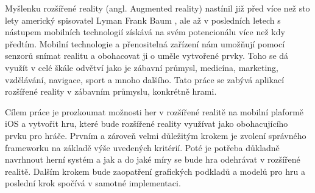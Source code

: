 \documentclass[twoside,12pt]{article}
\begin{document}
\def\,{\penalty10000\hskip.25em}
\pagestyle{headings}

\bakalarska





 
\newpage\null\thispagestyle{empty}\newpage




\obsah


%
%

% 
Myšlenku rozšířené reality (angl. Augmented reality) nastínil již před více než sto lety americký spisovatel Lyman Frank Baum \cite{baum}, ale až v posledních letech s nástupem mobilních technologií získává na svém potencionálu více než kdy předtím. Mobilní technologie a přenositelná zařízení nám umožňují pomocí senzorů snímat realitu a obohacovat ji o uměle vytvořené prvky. Toho se dá využít v celé škále odvětví jako je zábavní průmysl, medicína, marketing, vzdělávání, navigace, sport a mnoho dalšího. Tato práce se zabývá aplikací rozšířené reality v zábavním průmyslu, konkrétně hrami. 

% 
Cílem práce je prozkoumat možnosti her v rozšířené realitě na mobilní plaformě iOS a vytvořit hru, které bude rozšířené reality využívat jako obohacujícího prvku pro hráče. Prvním a zároveň velmi důležitým krokem je zvolení správného frameworku na základě výše uvedených kritérií. Poté je potřeba důkladně navrhnout herní systém a jak a do jaké míry se bude hra odehrávat v rozšířené realitě. Dalším krokem bude zaopatření grafických podkladů a modelů pro hru a poslední krok spočívá v samotné implementaci.

%
%
\end{document}
